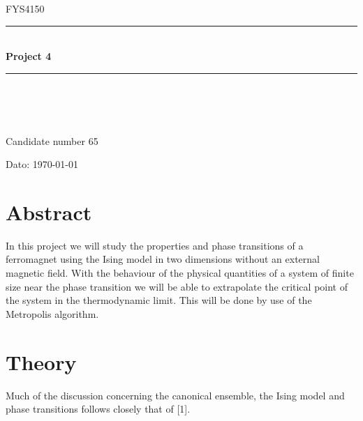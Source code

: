 \documentclass[english, 12pt]{article}
\begin{document}
\begin{titlepage}
\begin{center}

\textsc{\Large FYS4150}\\[0.5cm]
\rule{\linewidth}{0.5mm} \\[0.4cm]
{ \huge \bfseries  Project 4}\\[0.10cm]
\rule{\linewidth}{0.5mm} \\[1.5cm]
\textsc{\Large }\\[1.5cm]
\textsc{}\\[1.5cm]

\begin{minipage}{0.49\textwidth}
    \begin{center} \large
        Candidate number 65 \\[0.8cm]
    \end{center}
\end{minipage}


\vfill

\large{Dato: \today}

\end{center}
\end{titlepage}

\section*{Abstract}

In this project we will study the properties and phase transitions of a ferromagnet using the Ising model in two dimensions without an external magnetic field. With the behaviour of the physical quantities of a system of finite size near the phase transition we will be able to extrapolate the critical point of the system in the thermodynamic limit. This will be done by use of the Metropolis algorithm.


\section{Theory}
Much of the discussion concerning the canonical ensemble, the Ising model and phase transitions follows closely that of [1].
\end{document}
